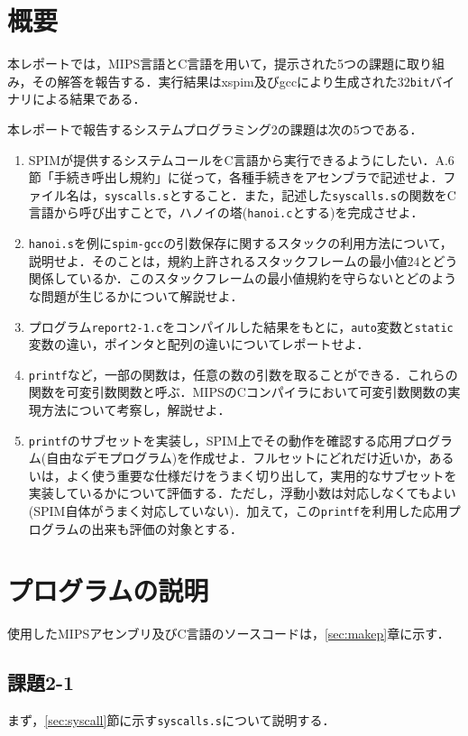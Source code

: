 \section{概要} \label{sec:abstract}
本レポートでは，MIPS言語とC言語を用いて，提示された5つの課題に取り組み，その解答を報告する．実行結果はxspim及びgccにより生成された$32$\verb|bit|バイナリによる結果である．

本レポートで報告するシステムプログラミング2の課題は次の5つである．
\begin{enumerate}
\item SPIMが提供するシステムコールをC言語から実行できるようにしたい．A.6節「手続き呼出し規約」に従って，各種手続きをアセンブラで記述せよ\cite{book:assembly}．ファイル名は，\verb|syscalls.s|とすること．また，記述した\verb|syscalls.s|の関数をC言語から呼び出すことで，ハノイの塔(\verb|hanoi.c|とする)を完成させよ．
\item \verb|hanoi.s|を例に\verb|spim-gcc|の引数保存に関するスタックの利用方法について，説明せよ．そのことは，規約上許されるスタックフレームの最小値$24$とどう関係しているか．このスタックフレームの最小値規約を守らないとどのような問題が生じるかについて解説せよ．
\item プログラム\verb|report2-1.c|をコンパイルした結果をもとに，\verb|auto|変数と\verb|static|変数の違い，ポインタと配列の違いについてレポートせよ．
\item \verb|printf|など，一部の関数は，任意の数の引数を取ることができる．これらの関数を可変引数関数と呼ぶ．MIPSのCコンパイラにおいて可変引数関数の実現方法について考察し，解説せよ．
\item \verb|printf|のサブセットを実装し，SPIM上でその動作を確認する応用プログラム(自由なデモプログラム)を作成せよ．フルセットにどれだけ近いか，あるいは，よく使う重要な仕様だけをうまく切り出して，実用的なサブセットを実装しているかについて評価する．ただし，浮動小数は対応しなくてもよい(SPIM自体がうまく対応していない)．加えて，この\verb|printf|を利用した応用プログラムの出来も評価の対象とする．
\end{enumerate}


\section{プログラムの説明}\label{sec:capp}
使用したMIPSアセンブリ及びC言語のソースコードは，\ref{sec:makep}章に示す．

\subsection{課題2-1}
まず，\ref{sec:syscall}節に示す\verb|syscalls.s|について説明する．

